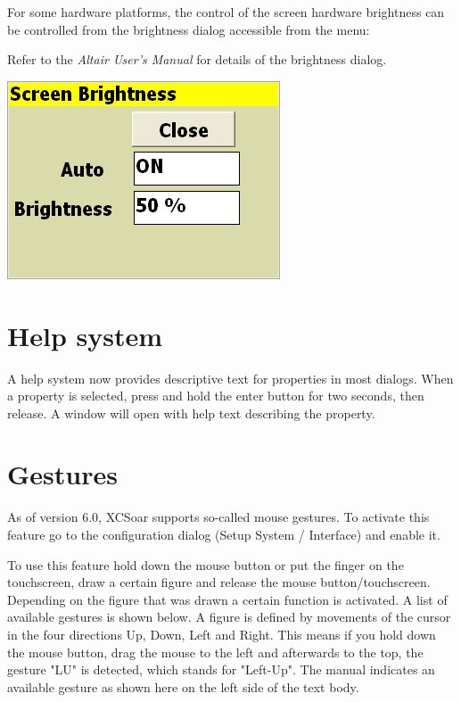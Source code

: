 \documentclass[a4paper,12pt]{refrep}
\begin{document}
For some hardware platforms, the control of the screen hardware 
brightness can be controlled from the brightness dialog
accessible from the menu:
\begin{quote}
\blink{}
\end{quote}

Refer to the {\em Altair User's Manual} for details of the brightness
dialog.

\begin{center}
\includegraphics[angle=0,width=0.45\linewidth,keepaspectratio='true']{figures/brightness.png}
\end{center}

\section{Help system}
  A help system now provides descriptive text for properties in
  most dialogs.  When a property is selected, press and hold the
  enter button for two seconds, then release.  A window will open with
  help text describing the property.

\section{Gestures}
  As of version 6.0, XCSoar supports so-called mouse gestures. To activate 
  this feature go to the configuration dialog (Setup System / Interface) and
  enable it.

  To use this feature hold down the mouse button or put the finger on the 
  touchscreen, draw a certain figure and release the mouse 
  button/touchscreen. Depending on the figure that was drawn 
  a certain function is activated. A list of available gestures is 
  shown below. A figure is defined by movements of the 
  cursor in the four directions Up, Down, Left and Right. This means if 
  you hold down the mouse button, drag the mouse to the left 
  and afterwards to the top,  the gesture "LU" is detected,
  which stands for "Left-Up". The manual indicates an available gesture as shown
  here on the left side of the text body.
\end{document}
